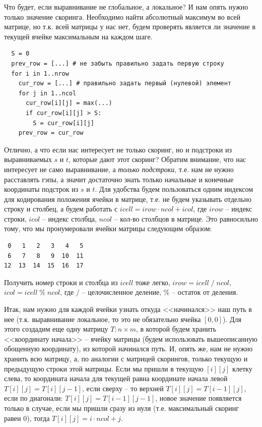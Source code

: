 \documentclass[letterpaper, 11pt]{article}
\begin{document}
Что будет, если выравнивание не глобальное, а локальное? И нам опять нужно только значение скоринга. Необходимо найти абсолютный максимум во всей матрице, но т.к. всей матрицы у нас нет, будем проверять является ли значение в текущей ячейке максимальным на каждом шаге.

\begin{verbatim}
  S = 0
  prev_row = [...] # не забыть правильно задать первую строку
  for i in 1..nrow
    cur_row = [...] # правильно задать первый (нулевой) элемент
    for j in 1..ncol
      cur_row[i][j] = max(...)
      if cur_row[i][j] > S:
        S = cur_row[i][j]
    prev_row = cur_row
\end{verbatim}

Отлично, а что если нас интересует не только скоринг, но и подстроки из выравниваемых $s$ и $t$, которые дают этот скоринг? Обратим внимание, что нас интересует не само выравнивание, а \textit{только подстроки}, т.е. нам не нужно расставлять гэпы, а значит достаточно знать только начальные и конечные координаты подстрок из $s$ и $t$. Для удобства будем пользоваться одним индексом для кодирования положения ячейки в матрице, т.е. не будем указывать отдельно строку и столбец, а будем работать с $icell = irow \cdot ncol + icol$, где $irow$ -- индекс строки, $icol$ -- индекс столбца, $ncol$ -- кол-во столбцов в матрице. Это равносильно тому, что мы пронумеровали ячейки матрицы следующим образом:

\begin{verbatim}
 0   1   2   3   4   5
 6   7   8   9  10  11
12  13  14  15  16  17
\end{verbatim}

Получить номер строки и столбца из $icell$ тоже легко, $irow = icell \; / \; ncol$, $icol = icell \; \% \; ncol$, где $/$ -- целочисленное деление, $\%$ -- остаток от деления.

Итак, нам нужно для каждой ячейки узнать откуда <<начинался>> наш путь в нее (т.к. выравнивание локальное, то это не обязательно ячейка $[0, 0]$). Для этого создадим еще одну матрицу $T : n \times m$, в которой будем хранить <<координату начала>> -- ячейку матрицы (будем использовать вышеописанную обощенную координату), из которой начинался путь. И, опять же, нам не нужно хранить всю матрицу, а, по аналогии с матрицей скорингов, только текущую и предыдущую строки этой матрицы. Если мы пришли в текущую $[i][j]$ клетку слева, то координата начала для текущей равна координате начала левой $T[i][j] = T[i][j - 1]$, если сверху -- то верхней $T[i][j] = T[i - 1][j]$, если по диагонали: $T[i][j] = T[i - 1][j - 1]$, новое значение появляется только в случае, если мы пришли сразу из нуля (т.е. максимальный скоринг равен $0$), тогда $T[i][j] = i \cdot ncol + j$.
\end{document}
